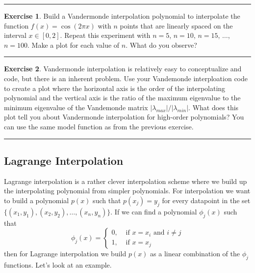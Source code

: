 \documentclass[
]{book}
\theoremstyle{definition}
\theoremstyle{definition}
\theoremstyle{definition}
\newtheorem{exercise}{Exercise}[chapter]
\theoremstyle{remark}
\begin{document}
\begin{center}\rule{0.5\linewidth}{0.5pt}\end{center}

\begin{exercise}
\protect\hypertarget{exr:unnamed-chunk-842}{}{\label{exr:unnamed-chunk-842} }Build a Vandermonde interpolation polynomial to interpolate the function \(f(x) = \cos(2 \pi x)\) with \(n\) points that are linearly spaced on the interval \(x \in [0,2]\). Repeat this experiment with \(n=5\), \(n=10\), \(n=15\), \(\ldots\), \(n=100\). Make a plot for each value of \(n\). What do you observe?
\end{exercise}

\begin{center}\rule{0.5\linewidth}{0.5pt}\end{center}

\begin{exercise}
\protect\hypertarget{exr:unnamed-chunk-843}{}{\label{exr:unnamed-chunk-843} }Vandermonde interpolation is relatively easy to conceptualize and code, but there is an inherent problem. Use your Vandemonde interploation code to create a plot where the horizontal axis is the order of the interpolating polynomial
and the vertical axis is the ratio of the maximum eigenvalue to the minimum eigenvalue of the Vandemonde matrix \(|\lambda_{max}|/|\lambda_{min}|\). What does this plot tell you about Vandermonde interpolation for high-order polynomials? You can use the same model function as from the previous exercise.
\end{exercise}

\begin{center}\rule{0.5\linewidth}{0.5pt}\end{center}

\hypertarget{lagrange-interpolation}{%
\subsection{Lagrange Interpolation}\label{lagrange-interpolation}}

Lagrange interpolation is a rather clever interpolation scheme where we build up the interpolating polynomial from simpler polynomials. For interpolation we
want to build a polynomial \(p(x)\) such that \(p(x_j) = y_j\) for every datapoint in the set \(\{(x_1,y_1), (x_2, y_2), \ldots, (x_n,y_n)\}\). If we can find a polynomial \(\phi_j(x)\) such that
\[\phi_j(x) = \left\{ \begin{array}{ll} 0, & \text{ if } x = x_i \text{ and } i \ne j \\ 1, & \text{ if
    } x=x_j \end{array} \right.\]
then for Lagrange interpolation we build \(p(x)\) as a linear combination of the \(\phi_j\) functions. Let's look at an example.
\end{document}

